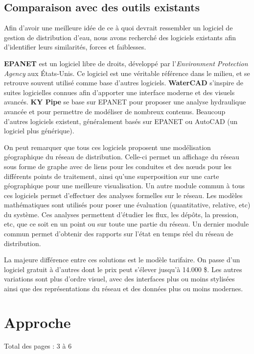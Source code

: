 \documentclass{eplmastersthesis_FR}
\begin{document}
		\section{Comparaison avec des outils existants}

			Afin d'avoir une meilleure idée de ce à quoi devrait ressembler un logiciel de gestion de distribution d'eau, nous avons recherché des logiciels existants afin d'identifier leurs similarités, forces et faiblesses.

			\textbf{EPANET} est un logiciel libre de droits, développé par l'\emph{Environment Protection Agency} aux États-Unis. Ce logiciel est une véritable référence dans le milieu, et se retrouve souvent utilisé comme base d'autres logiciels. \textbf{WaterCAD} s'inspire de suites logicielles connues afin d'apporter une interface moderne et des visuels avancés. \textbf{KY Pipe} se base sur EPANET pour proposer une analyse hydraulique avancée et pour permettre de modéliser de nombreux contenus. Beaucoup d'autres logiciels existent, généralement basés sur EPANET ou AutoCAD (un logiciel plus générique).

			On peut remarquer que tous ces logiciels proposent une modélisation géographique du réseau de distribution. Celle-ci permet un affichage du réseau sous forme de graphe avec de liens pour les conduites et des nœuds pour les différents points de traitement, ainsi qu'une superposition sur une carte géographique pour une meilleure visualisation. Un autre module commun à tous ces logiciels permet d'effectuer des analyses formelles sur le réseau. Les modèles mathématiques sont utilisés pour poser une évaluation (quantitative, relative, etc) du système. Ces analyses permettent d'étudier les flux, les dépôts, la pression, etc, que ce soit en un point ou sur toute une partie du réseau. Un dernier module commun permet d'obtenir des rapports sur l'état en temps réel du réseau de distribution.

			La majeure différence entre ces solutions est le modèle tarifaire. On passe d'un logiciel gratuit à d'autres dont le prix peut s'élever jusqu'à 14.000 \$. Les autres variations sont plus d'ordre visuel, avec des interfaces plus ou moins stylisées ainsi que des représentations du réseau et des données plus ou moins modernes.

	\chapter{Approche}

		Total des pages : 3 à 6
\end{document}
